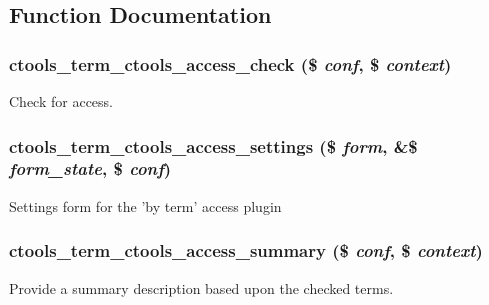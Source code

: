 \subsection{Function Documentation}
\hypertarget{access_2term_8inc_a62d339b0ab972f44f9b35b30e2bcc8f1}{
\subsubsection[{ctools\_\-term\_\-ctools\_\-access\_\-check}]{\setlength{\rightskip}{0pt plus 5cm}ctools\_\-term\_\-ctools\_\-access\_\-check (\$ {\em conf}, \/  \$ {\em context})}}
\label{access_2term_8inc_a62d339b0ab972f44f9b35b30e2bcc8f1}
Check for access. \hypertarget{access_2term_8inc_a4e7a22eadf67fe18cec6795e81b38028}{
\subsubsection[{ctools\_\-term\_\-ctools\_\-access\_\-settings}]{\setlength{\rightskip}{0pt plus 5cm}ctools\_\-term\_\-ctools\_\-access\_\-settings (\$ {\em form}, \/  \&\$ {\em form\_\-state}, \/  \$ {\em conf})}}
\label{access_2term_8inc_a4e7a22eadf67fe18cec6795e81b38028}
Settings form for the 'by term' access plugin \hypertarget{access_2term_8inc_a6be495cdfeabc7ef890ec0e740051735}{
\subsubsection[{ctools\_\-term\_\-ctools\_\-access\_\-summary}]{\setlength{\rightskip}{0pt plus 5cm}ctools\_\-term\_\-ctools\_\-access\_\-summary (\$ {\em conf}, \/  \$ {\em context})}}
\label{access_2term_8inc_a6be495cdfeabc7ef890ec0e740051735}
Provide a summary description based upon the checked terms. 

